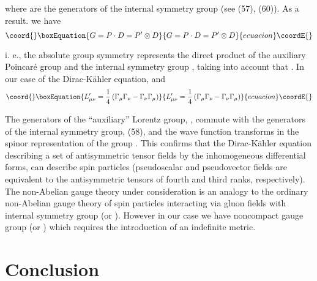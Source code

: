 \documentclass[a4paper,12pt]{article}
\begin{document}
where \coordHE{} are the generators of the internal symmetry group \coordHE{} (see (57), (60)). As a result. we have
\begin{equation}\coord{}\boxEquation{
G=P\cdot D=P^{\prime }\otimes D  \label{112}
}{
G=P\cdot D=P^{\prime }\otimes D  }{ecuacion}\coordE{}\end{equation}

i. e., the absolute group symmetry \coordHE{} represents the direct
product of the auxiliary Poincar\'e group \coordHE{} and the
internal symmetry group \coordHE{} , taking into account that \coordHE{}. In our case of the Dirac-K\"ahler equation, \coordHE{} and
\begin{equation}\coord{}\boxEquation{
L_{\mu \nu }^{\prime }=\frac 14\left( \Gamma _\mu \Gamma _\nu -\Gamma _\nu
\Gamma _\mu \right)  \label{113}
}{
L_{\mu \nu }^{\prime }=\frac 14\left( \Gamma _\mu \Gamma _\nu -\Gamma _\nu
\Gamma _\mu \right)  }{ecuacion}\coordE{}\end{equation}

The generators of the ``auxiliary'' Lorentz group, \coordHE{}, commute with the generators of the internal symmetry
group, \coordHE{} (58), and the wave function transforms in the
spinor representation of the group \coordHE{}. This confirms that the Dirac-K\"ahler equation
describing a set of antisymmetric tensor fields by the
inhomogeneous differential forms, can describe spin \coordHE{}
particles (pseudoscalar and pseudovector fields are equivalent to
the antisymmetric tensors of fourth and third ranks,
respectively). The non-Abelian gauge theory under consideration is
an analogy to the ordinary non-Abelian gauge theory of spin \coordHE{}
particles interacting via gluon fields with internal symmetry
group \coordHE{} (or \coordHE{}). However in our case we have noncompact
gauge group \coordHE{} (or \coordHE{}) which requires the
introduction of an indefinite metric.

\section{Conclusion}
\end{document}
